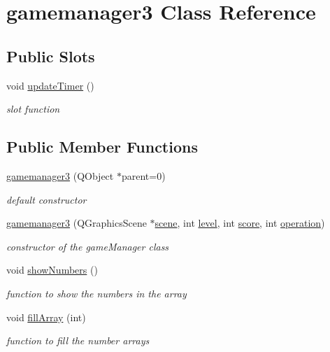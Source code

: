 \hypertarget{classgamemanager3}{\section{gamemanager3 \-Class \-Reference}
\label{classgamemanager3}
}
\subsection*{\-Public \-Slots}
\begin{DoxyCompactItemize}
\item 
void \hyperlink{classgamemanager3_a42d2b74bea7a9439b7d6a103e5c23fb4}{update\-Timer} ()
\begin{DoxyCompactList}\small\item\em slot function \end{DoxyCompactList}\end{DoxyCompactItemize}
\subsection*{\-Public \-Member \-Functions}
\begin{DoxyCompactItemize}
\item 
\hypertarget{classgamemanager3_a9b15cbfc06d0c3bdd96d452c15796cf2}{\hyperlink{classgamemanager3_a9b15cbfc06d0c3bdd96d452c15796cf2}{gamemanager3} (\-Q\-Object $\ast$parent=0)}\label{classgamemanager3_a9b15cbfc06d0c3bdd96d452c15796cf2}

\begin{DoxyCompactList}\small\item\em default constructor \end{DoxyCompactList}\item 
\hyperlink{classgamemanager3_ad52c0854f14a51e33b3f4a5c9cbb5098}{gamemanager3} (\-Q\-Graphics\-Scene $\ast$\hyperlink{classgamemanager3_a3de0a0584a1cb35d7b1e29f0db98e7e9}{scene}, int \hyperlink{classgamemanager3_a4e1ef9315c59af9184dee4e0de7569ae}{level}, int \hyperlink{classgamemanager3_a64da8bb7aa34dab1d2aeeb99e7f75265}{score}, int \hyperlink{classgamemanager3_a4de64fedcafac16c16f82d060ea3dfd9}{operation})
\begin{DoxyCompactList}\small\item\em constructor of the game\-Manager class \end{DoxyCompactList}\item 
void \hyperlink{classgamemanager3_ae88794ef0ad514a329b2972e615f5081}{show\-Numbers} ()
\begin{DoxyCompactList}\small\item\em function to show the numbers in the array \end{DoxyCompactList}\item 
void \hyperlink{classgamemanager3_a410042cd895aa4703a81ad456ad5339a}{fill\-Array} (int)
\begin{DoxyCompactList}\small\item\em function to fill the number arrays \end{DoxyCompactList}\end{DoxyCompactItemize}
